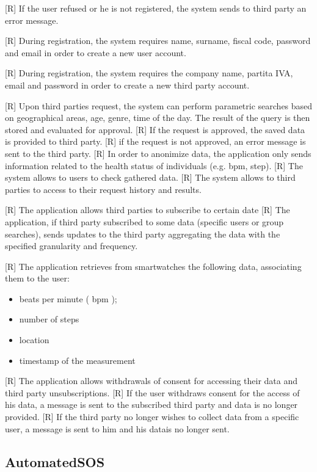     [R] If the user refused or he is not registered, the system sends to third party an error message.

[R] During registration, the system requires name, surname, fiscal code, password and email in order to create a new user account.

[R] During registration, the system requires the company name, partita IVA, email and password in order to create a new third party account.

[R] Upon third parties request, the system can perform parametric searches based on geographical areas, age, genre, time of the day. The result of the query is then stored and evaluated for approval.
    [R] If the request is approved, the saved data is provided to third party.
    [R] if the request is not approved, an error message is sent to the third party.
    [R] In order to anonimize data, the application only sends information related to the health status of individuals (e.g. bpm, step).
[R] The system allows to users to check gathered data.
[R] The system allows to third parties to access to their request history and results.

[R] The application allows third parties to subscribe to certain date
    [R] The application, if third party subscribed to some data (specific users or group searches), sends updates to the third party aggregating the data with the specified granularity and frequency.

[R] The application retrieves from smartwatches the following data, associating them to the user: 
\begin{itemize}
    \item beats per minute ( bpm );
    \item number of steps
    \item location
    \item timestamp of the measurement
\end{itemize}

[R] The application allows withdrawals of consent for accessing their data and third party unsubscriptions.
    [R] If the user withdraws consent for the access of his data, a message is sent to the subscribed third party and data is no longer provided.
    [R] If the third party no longer wishes to collect data from a specific user, a message is sent to him and his datais no longer sent.



\subsection{AutomatedSOS }

